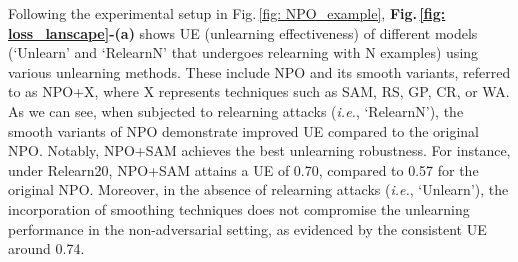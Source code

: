 

Following the experimental setup in Fig.\,\ref{fig: NPO_example}, \textbf{Fig.\,\ref{fig: loss_lanscape}-(a)} shows UE (unlearning effectiveness) of different models (`Unlearn' and `Relearn$\mathrm{N}$' that undergoes relearning with $\mathrm{N}$ examples) using various unlearning methods. These include NPO and its smooth variants, referred to as NPO+X, where X represents techniques such as SAM, RS, GP, CR, or WA. 
As we can see, when subjected to relearning attacks (\textit{i.e.}, `Relearn$\mathrm{N}$'), the smooth variants of NPO demonstrate improved UE compared to the original NPO. Notably, NPO+SAM  achieves the best unlearning robustness. For instance, under Relearn20, NPO+SAM attains a UE of 0.70, compared to 0.57 for the original NPO.
Moreover, in the absence of relearning attacks (\textit{i.e.}, `Unlearn'), the incorporation of smoothing techniques does not compromise the unlearning performance in the non-adversarial setting, as evidenced by the consistent  UE around 0.74.


